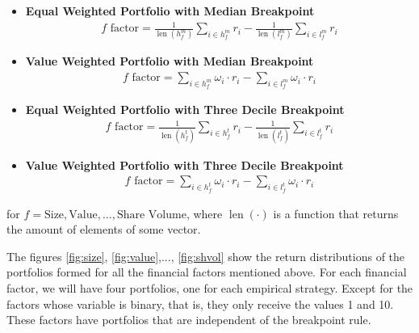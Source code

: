 \begin{itemize}
	\item \textbf{Equal Weighted Portfolio with Median Breakpoint}
	\begin{align*}
		f \text{ factor} = \frac{1}{\operatorname{len}(h_{f}^{m})}\sum_{i \in h_{f}^{m}} r_i - \frac{1}{\operatorname{len}(l_{f}^{m})}\sum_{i \in l_{f}^{m}} r_i
	\end{align*}
	
	\item \textbf{Value Weighted Portfolio with Median Breakpoint}
	\begin{align*}
		f \text{ factor} = \sum_{i \in h_{f}^{m}} \omega_i\cdot r_i - \sum_{i \in l_{f}^{m}} \omega_i\cdot r_i
	\end{align*}
	
	\item \textbf{Equal Weighted Portfolio with Three Decile Breakpoint}
	\begin{align*}
		f \text{ factor} = \frac{1}{\operatorname{len}(h_{f}^{t})}\sum_{i \in h_{f}^{t}} r_i - \frac{1}{\operatorname{len}(l_{f}^{t})}\sum_{i \in l_{f}^{t}} r_i
	\end{align*}
	
	\item \textbf{Value Weighted Portfolio with Three Decile Breakpoint}
	\begin{align*}
		f \text{ factor} = \sum_{i \in h_{f}^{t}} \omega_i\cdot r_i - \sum_{i \in l_{f}^{t}} \omega_i\cdot r_i
	\end{align*}
\end{itemize}
for $f= \text{Size}, \text{Value}, ..., \text{Share Volume}$, where $\operatorname{len}(\cdot)$ is a function that returns the amount of elements of some vector.

The figures \ref{fig:size}, \ref{fig:value},..., \ref{fig:shvol} show the return distributions of the portfolios formed for all the financial factors mentioned above. For each financial factor, we will have four portfolios, one for each empirical strategy. Except for the factors whose variable is binary, that is, they only receive the values 1 and 10. These factors have portfolios that are independent of the breakpoint rule.




